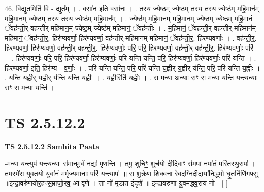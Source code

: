 \documentclass[17pt]{extarticle}
\begin{document}
46. वि॒द्युत॒मिति॑ वि - द्युत᳚म् । . वसा॑न॒ इति॒ वसा॑नः । . तस्य॒ ज्येष्ठ॒म् ज्येष्ठ॒म् तस्य॒ तस्य॒ ज्येष्ठ॑म् महि॒मान॑म् महि॒मान॒म् ज्येष्ठ॒म् तस्य॒ तस्य॒ ज्येष्ठ॑म् महि॒मान᳚म् । . ज्येष्ठ॑म् महि॒मान॑म् महि॒मान॒म् ज्येष्ठ॒म् ज्येष्ठ॑म् महि॒मानं॒ ॅवह॑न्ती॒र् वह॑न्तीर् महि॒मान॒म् ज्येष्ठ॒म् ज्येष्ठ॑म् महि॒मानं॒ ॅवह॑न्तीः । . म॒हि॒मानं॒ ॅवह॑न्ती॒र् वह॑न्तीर् महि॒मान॑म् महि॒मानं॒ ॅवह॑न्ती॒र्॒. हिर॑ण्यवर्णा॒ हिर॑ण्यवर्णा॒ वह॑न्तीर् महि॒मान॑म् महि॒मानं॒ ॅवह॑न्ती॒र्॒. हिर॑ण्यवर्णाः । . वह॑न्ती॒र्॒. हिर॑ण्यवर्णा॒ हिर॑ण्यवर्णा॒ वह॑न्ती॒र् वह॑न्ती॒र्॒. हिर॑ण्यवर्णाः॒ परि॒ परि॒ हिर॑ण्यवर्णा॒ वह॑न्ती॒र् वह॑न्ती॒र्॒. हिर॑ण्यवर्णाः॒ परि॑ । . हिर॑ण्यवर्णाः॒ परि॒ परि॒ हिर॑ण्यवर्णा॒ हिर॑ण्यवर्णाः॒ परि॑ यन्ति यन्ति॒ परि॒ हिर॑ण्यवर्णा॒ हिर॑ण्यवर्णाः॒ परि॑ यन्ति । . हिर॑ण्यवर्णा॒ इति॒ हिर॑ण्य - व॒र्णाः॒ । . परि॑ यन्ति यन्ति॒ परि॒ परि॑ यन्ति य॒ह्वीर् य॒ह्वीर् य॑न्ति॒ परि॒ परि॑ यन्ति य॒ह्वीः । . य॒न्ति॒ य॒ह्वीर् य॒ह्वीर् य॑न्ति यन्ति य॒ह्वीः । . य॒ह्वीरिति॑ य॒ह्वीः । . स म॒न्या अ॒न्याः सꣳ स म॒न्या यन्ति॒ यन्त्य॒न्याः सꣳ स म॒न्या यन्ति॑ । \newline
\pagebreak
{}
\section*{ TS 2.5.12.2 }

\textbf{TS 2.5.12.2 } \newline
\textbf{Samhita Paata} \newline

-म॒न्या यन्त्युप॑ यन्त्य॒न्याः स॑मा॒नमू॒र्वं न॒द्यः॑ पृणन्ति । तमू॒ शुचिꣳ॒॒ शुच॑यो दीदि॒वाꣳ स॑म॒पां नपा॑तं॒ परि॑तस्थु॒रापः॑ । तमस्मे॑रा युव॒तयो॒ युवा॑नं मर्मृ॒ज्यमा॑नाः॒ परि॑ य॒न्त्यापः॑ ॥ स शु॒क्रेण॒ शिक्व॑ना रे॒वद॒ग्निर्दी॒दाया॑नि॒द्ध्मो घृ॒तनि॑र्णिग॒फ्सु ॥इन्द्रा॒वरु॑णयोर॒हꣳस॒म्राजो॒रव॒ आ वृ॑णे । ता नो॑ मृडात ई॒दृशे᳚ ॥ इन्द्रा॑वरुणा यु॒वम॑द्ध्व॒राय॑ नो - [  ] \newline
\end{document}
